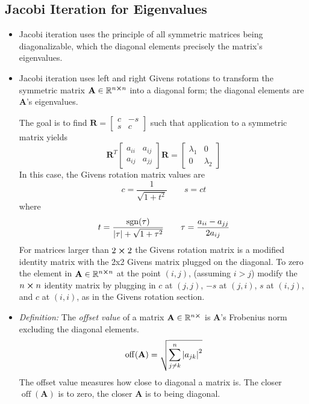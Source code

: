 \documentclass[11pt, a4paper]{article}
\newcommand{\R}{\mathbb{R}} %
\newcommand{\mat}[1]{\mathbf{#1}} %
\begin{document}
\subsection{Jacobi Iteration for Eigenvalues}
\begin{itemize}
	\item Jacobi iteration uses the principle of all symmetric matrices being diagonalizable, which the diagonal elements precisely the matrix's eigenvalues.
	
	\item Jacobi iteration uses left and right Givens rotations to transform the symmetric matrix $ \mat{A} \in \R^{n \cross n} $ into a diagonal form; the diagonal elements are $ \mat{A} $'s eigenvalues.
	
	The goal is to find $ \mat{R} = \begin{bmatrix}
		c & - s \\ s & c
	\end{bmatrix} $ such that application to a symmetric matrix yields
	\begin{equation*}
		\mat{R}^{T} 
		\begin{bmatrix}
			a_{ii} & a_{ij}\\
			a_{ij} & a_{jj}
		\end{bmatrix}
		\mat{R} = 
		\begin{bmatrix}
			\lambda_{1} & 0\\
			0 & \lambda_{2}
		\end{bmatrix}
	\end{equation*}
	In this case, the Givens rotation matrix values are
	\begin{equation*}
		c = \frac{1}{\sqrt{1 + t^{2}}} \qquad s = ct
	\end{equation*}
	where
	\begin{equation*}
		t = \frac{\operatorname{sgn}(\tau)}{\abs{\tau} + \sqrt{1 + \tau^{2}}} \qquad \tau = \frac{a_{ii}- a_{jj}}{2a_{ij}}
	\end{equation*}
	For matrices larger than $ 2 \cross 2 $ the Givens rotation matrix is a modified identity matrix with the 2x2 Givens matrix plugged on the diagonal. To zero the element in $ \mat{A} \in \R^{n \cross n} $ at the point $ (i, j) $, (assuming $ i > j $) modify the $ n \cross n $ identity matrix by plugging in $ c $ at $ (j, j) $, $ -s $ at $ (j, i) $, $ s $ at $ (i, j) $, and $ c $ at $ (i, i) $, as in the Givens rotation section.
	
	
	\item \textit{Definition:} The \textit{offset value} of a matrix $ \mat{A} \in \R^{n \cross } $ is $ \mat{A} $'s Frobenius norm excluding the diagonal elements. 
	\begin{equation*}
		\operatorname{off}(\mat{A}) = \sqrt{\sum_{j\neq k}^{n}\abs{a_{jk}}^2 } 
	\end{equation*}
	The offset value measures how close to diagonal a matrix is. The closer $ \operatorname{off}(\mat{A}) $  is to zero, the closer $ \mat{A} $ is to being diagonal.
		

\end{itemize}
\end{document}
